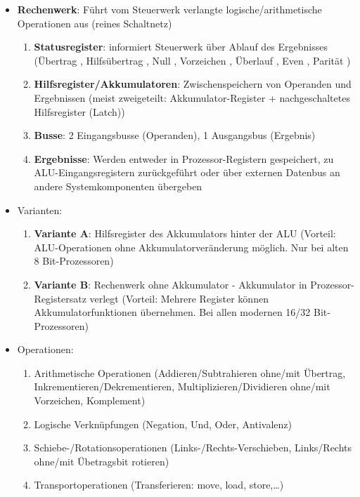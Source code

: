 \begin{itemize}
	\item \textbf{\textcolor{green!60!black}{Rechenwerk}}: Führt vom Steuerwerk verlangte logische/arithmetische Operationen aus (reines Schaltnetz)
	\begin{enumerate}
		\item \textbf{Statusregister}: informiert Steuerwerk über Ablauf des Ergebnisses (Übertrag , Hilfsübertrag , Null , Vorzeichen , Überlauf , Even , Parität )
		\item \textbf{Hilfsregister/Akkumulatoren}: Zwischenspeichern von Operanden und Ergebnissen (meist zweigeteilt: Akkumulator-Register  + nachgeschaltetes Hilfsregister  (Latch))
		\item \textbf{Busse}: 2 Eingangsbusse (Operanden), 1 Ausgangsbus (Ergebnis)
		\item \textbf{Ergebnisse}: Werden entweder in Prozessor-Registern gespeichert, zu ALU-Eingangsregistern zurückgeführt oder über externen Datenbus an andere Systemkomponenten übergeben
	\end{enumerate}
	\item Varianten:
	\begin{enumerate}
		\item \textbf{Variante A}: Hilfsregister des Akkumulators hinter der ALU (Vorteil: ALU-Operationen ohne Akkumulatorveränderung möglich. Nur bei alten 8 Bit-Prozessoren)
		\item \textbf{Variante B}: Rechenwerk ohne Akkumulator - Akkumulator in Prozessor-Registersatz verlegt (Vorteil: Mehrere Register können Akkumulatorfunktionen übernehmen. Bei allen modernen 16/32 Bit-Prozessoren)
	\end{enumerate}

	\item Operationen:
	\begin{enumerate}
		\item Arithmetische Operationen (Addieren/Subtrahieren ohne/mit Übertrag, Inkrementieren/Dekrementieren, Multiplizieren/Dividieren ohne/mit Vorzeichen, Komplement)
		\item Logische Verknüpfungen (Negation, Und, Oder, Antivalenz)
		\item Schiebe-/Rotationsoperationen (Links-/Rechts-Verschieben, Links/Rechts ohne/mit Übetragsbit rotieren)
		\item Transportoperationen (Transferieren: move, load, store,\dots)
	\end{enumerate}


\end{itemize}
